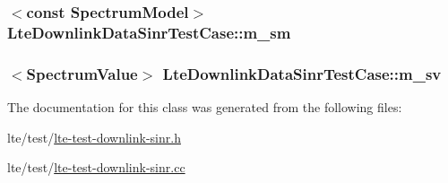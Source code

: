 \subsubsection[{\texorpdfstring{m\+\_\+sm}{m_sm}}]{$<$const {\bf Spectrum\+Model}$>$ Lte\+Downlink\+Data\+Sinr\+Test\+Case\+::m\+\_\+sm\hspace{0.3cm}{\ttfamily [private]}}\hypertarget{classLteDownlinkDataSinrTestCase_a40a431bb7ebfbb6b4a60ed281db7e173}{}\label{classLteDownlinkDataSinrTestCase_a40a431bb7ebfbb6b4a60ed281db7e173}
\subsubsection[{\texorpdfstring{m\+\_\+sv}{m_sv}}]{$<${\bf Spectrum\+Value}$>$ Lte\+Downlink\+Data\+Sinr\+Test\+Case\+::m\+\_\+sv\hspace{0.3cm}{\ttfamily [private]}}\hypertarget{classLteDownlinkDataSinrTestCase_aacc1cc479474b53cb702f762c3bb0bfb}{}\label{classLteDownlinkDataSinrTestCase_aacc1cc479474b53cb702f762c3bb0bfb}


The documentation for this class was generated from the following files\+:\begin{DoxyCompactItemize}
\item 
lte/test/\hyperlink{lte-test-downlink-sinr_8h}{lte-\/test-\/downlink-\/sinr.\+h}\item 
lte/test/\hyperlink{lte-test-downlink-sinr_8cc}{lte-\/test-\/downlink-\/sinr.\+cc}\end{DoxyCompactItemize}
